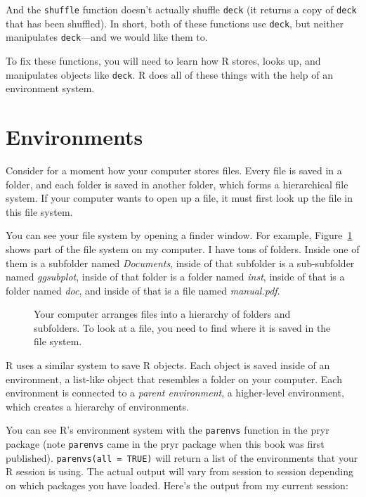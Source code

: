 \documentclass[
  letterpaper,
  DIV=11,
  numbers=noendperiod]{scrbook}
\makeatletter
\newcommand*\pandocbounded[1]{%
  \sbox\pandoc@box{#1}%
  \Gscale@div\@tempa{\textheight}{\dimexpr\ht\pandoc@box+\dp\pandoc@box\relax}%
  \Gscale@div\@tempb{\linewidth}{\wd\pandoc@box}%
  \ifdim\@tempb\p@<\@tempa\p@\let\@tempa\@tempb\fi%
  \ifdim\@tempa\p@<\p@\scalebox{\@tempa}{\usebox\pandoc@box}%
  \else\usebox{\pandoc@box}%
  \fi%
}
\makeatother
\begin{document}
And the \texttt{shuffle} function doesn't actually shuffle \texttt{deck}
(it returns a copy of \texttt{deck} that has been shuffled). In short,
both of these functions use \texttt{deck}, but neither manipulates
\texttt{deck}---and we would like them to.

To fix these functions, you will need to learn how R stores, looks up,
and manipulates objects like \texttt{deck}. R does all of these things
with the help of an environment system.

\section{Environments}\label{environments}

Consider for a moment how your computer stores files. Every file is
saved in a folder, and each folder is saved in another folder, which
forms a hierarchical file system. If your computer wants to open up a
file, it must first look up the file in this file system.

You can see your file system by opening a finder window. For example,
Figure~\ref{fig-folders} shows part of the file system on my computer. I
have tons of folders. Inside one of them is a subfolder named
\emph{Documents}, inside of that subfolder is a sub-subfolder named
\emph{ggsubplot}, inside of that folder is a folder named \emph{inst},
inside of that is a folder named \emph{doc}, and inside of that is a
file named \emph{manual.pdf}.

\begin{figure}

\centering{

\pandocbounded{\texttt{[image: images/hopr\_0601.png]}}

}

\caption{\label{fig-folders}Your computer arranges files into a
hierarchy of folders and subfolders. To look at a file, you need to find
where it is saved in the file system.}

\end{figure}%

R uses a similar system to save R objects. Each object is saved inside
of an environment, a list-like object that resembles a folder on your
computer. Each environment is connected to a \emph{parent environment},
a higher-level environment, which creates a hierarchy of environments.

You can see R's environment system with the \texttt{parenvs} function in
the pryr package (note \texttt{parenvs} came in the pryr package when
this book was first published). \texttt{parenvs(all\ =\ TRUE)} will
return a list of the environments that your R session is using. The
actual output will vary from session to session depending on which
packages you have loaded. Here's the output from my current session:
\end{document}
